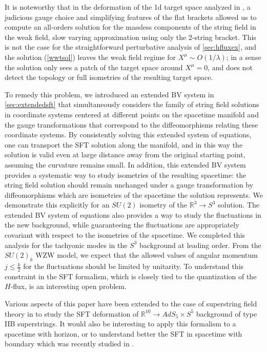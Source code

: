 \documentclass[12pt]{article}
\begin{document}
It is noteworthy that in the deformation of the 1d target space analyzed in \cite{Mazel:2024alu}, a judicious gauge choice and simplifying features of the flat brackets allowed us to compute an all-orders solution for the massless components of the string field in the weak field, slow varying approximation using only the 2-string bracket. This is not the case for the straightforward perturbative analysis of \ref{sec:hfluxex}, and the solution (\ref{wwtsol}) leaves the weak field regime for $X^\mu \sim O(1/\lambda)$; in a sense the solution only sees a patch of the target space around $X^\mu = 0$, and does not detect the topology or full isometries of the resulting target space.

To remedy this problem, we introduced an extended BV system in \ref{sec:extendedsft} that simultaneously considers the family of string field solutions in coordinate systems centered at different points on the spacetime manifold and the gauge transformations that correspond to the diffeomorphisms relating these coordinate systems. By consistently solving this extended system of equations, one can transport the SFT solution along the manifold, and in this way the solution is valid even at large distance away from the original starting point, assuming the curvature remains small. In addition, this extended BV system provides a systematic way to study isometries of the resulting spacetime: 
the string field solution should remain unchanged under a gauge transformation by diffeomorphisms which are isometries of the spacetime the solution represents.
We demonstrate this explicitly for an $SU(2)$ isometry of the $\mathbb{R}^3 \to S^3$ solution. The extended BV system of equations also provides a way to study the fluctuations in the new background, while guaranteeing the fluctuations are appropriately covariant with respect to the isometries of the spacetime. We completed this analysis for the tachyonic modes in the $S^3$ background at leading order.
From the $SU(2)_k$ WZW model, we expect that the allowed values of angular momentum $j \leq \frac{k}{2}$ for the fluctuations should be limited by unitarity. To understand this constraint in the SFT formalism, which is closely tied to the quantization of the $H$-flux, is an interesting open problem.


Various aspects of this paper have been extended to the case of superstring field theory in \cite{ads:fivepaper} to study the SFT deformation of $\mathbb{R}^{10} \to AdS_5\times S^5$ background of type IIB superstrings. It would also be interesting to apply this formalism to a spacetime with horizon, or to understand better the SFT in spacetime with boundary which was recently studied in \cite{Stettinger:2024uus, Firat:2024kxq, Maccaferri:2025orz}.
\end{document}
